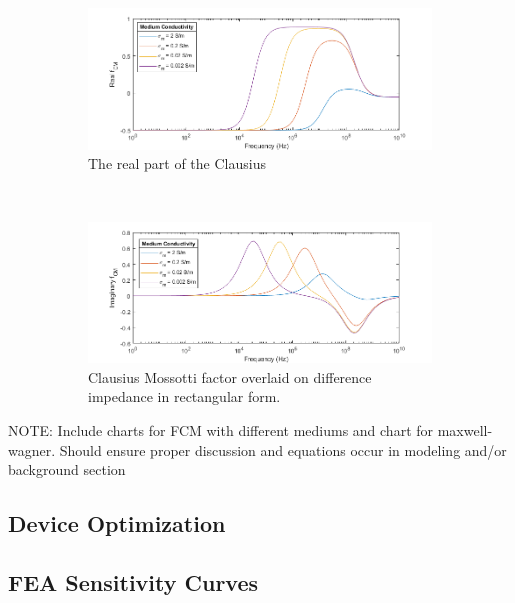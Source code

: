 \begin{figure}[t!]
    \centering
    \begin{subfigure}[b]{\textwidth}
        \centering
        \includegraphics[width=\textwidth]{images/realFCMvsConductvity.png}
        \caption{The real part of the Clausius}
        \label{}
    \end{subfigure}
    \\
    \vspace{0.1 in}
    \begin{subfigure}[b]{\textwidth}
        \centering
        \includegraphics[width=\textwidth]{images/imaginaryFCMvsConductvity.png}
        \caption{Clausius Mossotti factor overlaid on difference impedance in rectangular form.}
    \end{subfigure}
    \caption{}
    \label{}
\end{figure}

\par NOTE: Include charts for FCM with different mediums and chart for maxwell-wagner. Should ensure proper discussion and equations occur in modeling and/or background section


\subsection{Device Optimization}


\subsection*{FEA Sensitivity Curves}

